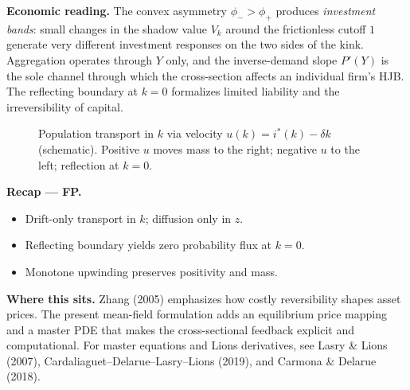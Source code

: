 \documentclass[11pt,letterpaper,oneside]{article}
\numberwithin{equation}{section}
\newcommand{\1}{\mathbf{1}}
\begin{document}
\begin{tcolorbox}[didacticstyle]
\textbf{Economic reading.} The convex asymmetry $\phi_->\phi_+$ produces \emph{investment bands}: small changes in the shadow value $V_k$ around the frictionless cutoff $1$ generate very different investment responses on the two sides of the kink. Aggregation operates through $Y$ only, and the inverse-demand slope $P'(Y)$ is the sole channel through which the cross-section affects an individual firm's HJB. The reflecting boundary at $k=0$ formalizes limited liability and the irreversibility of capital.
\end{tcolorbox}

\begin{figure}[ht]
\centering
{}
\caption{Population transport in $k$ via velocity $u(k)=i^*(k)-\delta k$ (schematic). Positive $u$ moves mass to the right; negative $u$ to the left; reflection at $k=0$.}
\end{figure}

\begin{tcolorbox}[didacticstyle]
\textbf{Recap — FP.}
\begin{itemize}[leftmargin=1.15em,itemsep=0.2em]
  \item Drift-only transport in $k$; diffusion only in $z$.
  \item Reflecting boundary yields zero probability flux at $k=0$.
  \item Monotone upwinding preserves positivity and mass.
\end{itemize}
\end{tcolorbox}

\begin{tcolorbox}[literaturestyle]
\textbf{Where this sits.} Zhang (2005) emphasizes how costly reversibility shapes asset prices. The present mean-field formulation adds an equilibrium price mapping and a master PDE that makes the cross-sectional feedback explicit and computational. For master equations and Lions derivatives, see Lasry \& Lions (2007), Cardaliaguet--Delarue--Lasry--Lions (2019), and Carmona \& Delarue (2018).
\end{tcolorbox}
\end{document}
